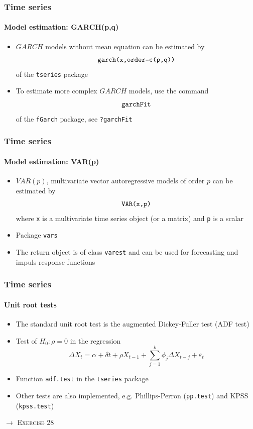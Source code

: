 \documentclass[title={Introduction to R}, author={Mutschler and Zaharieva}, inst={Institute for Econometrics and Empirical Economics}]{beamer}
\begin{document}
\begin{frame}	
	\frametitle{Time series}	
	\framesubtitle{Model estimation: GARCH(p,q)}	
	\begin{itemize}
		\item $GARCH$ models without mean equation can be estimated by%
		\begin{equation*}
		\text{\texttt{garch(x,order=c(p,q))}}
		\end{equation*}%
		of the \texttt{tseries} package		
		\item To estimate more complex $GARCH$ models, use the command%
		\begin{equation*}
		\text{\texttt{garchFit}}
		\end{equation*}%
		of the \texttt{fGarch} package, see \texttt{?garchFit}
	\end{itemize}
\end{frame}


\begin{frame}	
	\frametitle{Time series}	
	\framesubtitle{Model estimation: VAR(p)}	
	\begin{itemize}
		\item $VAR(p)$, multivariate vector autoregressive models of order $p$ can
		be estimated by%
		\begin{equation*}
		\text{\texttt{VAR(x,p)}}
		\end{equation*}%
		where \texttt{x} is a multivariate time series object (or a matrix) \newline
		and \texttt{p} is a scalar		
		\item Package \texttt{vars}		
		\item The return object is of class \texttt{varest} and can be used for
		forecasting and impuls response functions
	\end{itemize}
\end{frame}


\begin{frame}
	\frametitle{Time series}	
	\framesubtitle{Unit root tests}	
	\begin{itemize}
		\item The standard unit root test is the augmented Dickey-Fuller test (ADF
		test)		
		\item Test of $H_{0}:\rho =0$ in the regression
		\begin{equation*}
		\Delta X_{t}=\alpha +\delta t+\rho X_{t-1}+\sum_{j=1}^{k}\phi _{j}\Delta
		X_{t-j}+\varepsilon _{t}
		\end{equation*}		
		\item Function \texttt{adf.test} in the \texttt{tseries} package		
		\item Other tests are also implemented, e.g. Phillips-Perron (\texttt{pp.test}) and KPSS (\texttt{kpss.test})
	\end{itemize}\pause
	$\longrightarrow $ \textsc{Exercise 28}
\end{frame}
\end{document}
